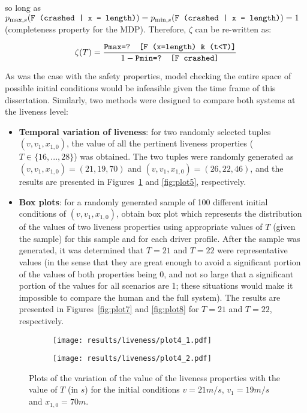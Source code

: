 so long as $p_{\max, s} (\text{\texttt{F (crashed | x = length)}}) = p_{\min, s} (\text{\texttt{F (crashed | x = length)}}) = 1$ (completeness property for the MDP). Therefore, $\zeta$ can be re-written as:

\begin{equation}
	\zeta(T) = \frac{\text{\texttt{Pmax=? [F (x=length) \& (t<T)]}}}{1 - \text{\texttt{Pmin=? [F crashed]}}}
\end{equation}

As was the case with the safety properties, model checking the entire space of possible initial conditions would be infeasible given the time frame of this dissertation. Similarly, two methods were designed to compare both systems at the liveness level:

\begin{itemize}
	\item \textbf{Temporal variation of liveness}: for two randomly selected tuples $(v, v_1, x_{1,0})$, the value of all the pertinent liveness properties ($T \in \{16,...,28\}$) was obtained. The two tuples were randomly generated as $(v, v_1, x_{1,0}) = (21, 19, 70)$ and $(v, v_1, x_{1,0}) = (26, 22, 46)$, and the results are presented in Figures~\ref{fig:plot4} and \ref{fig:plot5}, respectively.
	\item \textbf{Box plots}: for a randomly generated sample of 100 different initial conditions of $(v, v_1, x_{1,0})$, obtain box plot which represents the distribution of the values of two liveness properties using appropriate values of $T$ (given the sample) for this sample and for each driver profile. After the sample was generated, it was determined that $T=21$ and $T=22$ were representative values (in the sense that they are great enough to avoid a significant portion of the values of both properties being 0, and not so large that a significant portion of the values for all scenarios are 1; these situations would make it impossible to compare the human and the full system). The results are presented in Figures~\ref{fig:plot7} and \ref{fig:plot8} for $T=21$ and $T=22$, respectively.
\end{itemize}

\begin{figure}[H]
\centering
\begin{subfigure}{0.49\textwidth}
  \centering
  \texttt{[image: results/liveness/plot4\_1.pdf]}
\end{subfigure}
\begin{subfigure}{0.49\textwidth}
  \centering
  \texttt{[image: results/liveness/plot4\_2.pdf]}
\end{subfigure} 
\caption{Plots of the variation of the value of the liveness properties with the value of $T$ (in $s$) for the initial conditions $v = 21m/s$, $v_1 = 19m/s$ and $x_{1,0} = 70m$.}
\label{fig:plot4}
\end{figure}

